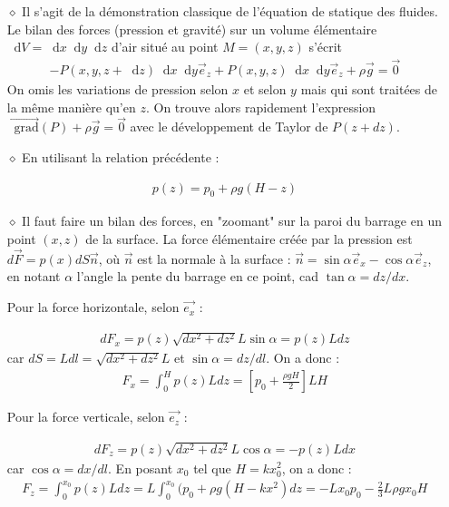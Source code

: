 \documentclass{report}
\newcommand*\dif{\mathop{}\!\mathrm{d}}
\newcommand*\grad{\mathop{}\!\mathrm{grad}}
\begin{document}
\begin{itemize}

	\item[$\diamond$] Il s'agit de la démonstration classique de l'équation de statique des fluides. Le bilan des forces (pression et gravité) sur un volume élémentaire $\dif V=\dif x \dif y \dif z$ d'air situé au point $M=(x,y,z)$ s'écrit
	\begin{align*}
		-P(x,y,z+ \dif z)\dif x\dif y\vec{e}_z+P(x,y,z)\dif x\dif y\vec{e}_z+\rho\vec{g}=\vec{0}
	\end{align*}
	On omis les variations de pression selon $x$ et selon $y$ mais qui sont traitées de la même manière qu'en $z$. On trouve alors rapidement l'expression $\vec{\grad}(P) + \rho\vec{g}=\vec{0}$ avec le développement de Taylor de $P(z+dz)$.
	
	\item[$\diamond$] En utilisant la relation précédente : 
	
	\begin{align*}
		p(z) = p_0+\rho g (H-z)
	\end{align*}
		
		\item[$\diamond$] Il faut faire un bilan des forces, en "zoomant" sur la paroi du barrage en un point $(x,z)$ de la surface. La force élémentaire créée par la pression est $d\vec{F}=p(x)dS\vec{n}$, où $\vec{n}$ est la normale à la surface : $\vec{n}=\sin\alpha\vec{e}_x-\cos\alpha\vec{e}_z$, en notant $\alpha$ l'angle la pente du barrage en ce point, cad $\tan\alpha=dz/dx$.
		
		Pour la force horizontale, selon $\vec{e_x}$ :
		
	\begin{align*}
		dF_x = p(z)\sqrt{dx^2+dz^2}L\sin\alpha=p(z)Ldz
	\end{align*}
	car $dS = Ldl=\sqrt{dx^2+dz^2}L$ et $\sin\alpha=dz/dl$. On a donc :
	\begin{align*}
		F_x = \int_0^H p(z)Ldz=\left[ p_0+\frac{\rho g H}{2}\right] LH
	\end{align*}
	
		Pour la force verticale, selon $\vec{e_z}$ :
		
	\begin{align*}
		dF_z= p(z)\sqrt{dx^2+dz^2}L\cos\alpha = -p(z)Ldx
	\end{align*}
	car $\cos\alpha=dx/dl$. En posant $x_0$ tel que $H=kx_0^2$, on a donc :
	\begin{align*}
		F_z = \int_0^{x_0} p(z)Ldz=L\int_0^{x_0} (p_0+\rho g (H-kx^2)dz=-Lx_0p_0-\frac{2}{3}L\rho g x_0H
	\end{align*}

\end{itemize}
\end{document}
